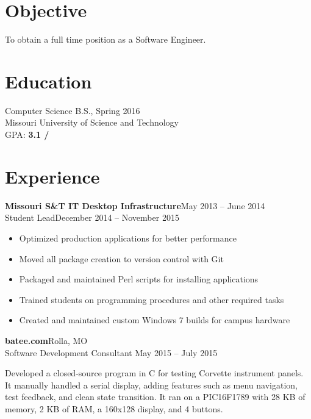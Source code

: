 \documentclass[margin]{res}
\begin{document}
  \begin{resume} 
   
    \section{Objective} 
      To obtain a full time position as a Software Engineer.

    \section{Education} 
      Computer Science B.S., Spring 2016 \\
      Missouri University of Science and Technology \\
      GPA: {\bf 3.1 \slash {}}

    \section{Experience}
       \textbf{Missouri S\&T IT Desktop Infrastructure}\hfill May 2013 -- June 2014\\
       Student Lead\hfill December 2014 -- November 2015
       \begin{itemize} \itemsep -1pt  %
         \item Optimized production applications for better performance
         \item Moved all package creation to version control with Git
         \item Packaged and maintained Perl scripts for installing applications
         \item Trained students on programming procedures and other required tasks
         \item Created and maintained custom Windows 7 builds for campus hardware
       \end{itemize}
       
    \textbf{batee.com}\hfill  Rolla, MO\\
       Software Development Consultant \hfill May 2015 -- July 2015\\
       \vspace{-1em}
       \begin{addmargin}[2.5em]{0em}
         Developed a closed-source program in C for testing Corvette instrument panels. 
         It manually handled a serial display, adding features such as menu navigation, 
         test feedback, and clean state transition. It ran on a PIC16F1789 with 28 KB of memory, 
         2 KB of RAM, a 160x128 display, and 4 buttons.
       \end{addmargin}
       

\end{resume}
\end{document}
